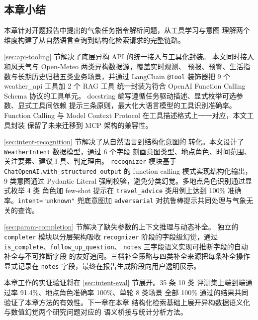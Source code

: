 
\subsection{本章小结}
\label{sec:retrieval-summary}

本章针对开题报告中提出的气象任务指令解析问题，从工具学习与意图
理解两个维度构建了从自然语言查询到结构化检索请求的完整链路。

\ref{sec:api-tooling} 节解决了底层异构 API 的统一接入与工具化封装。
本文同时接入和风天气与 Open-Meteo 两类异构数据源，覆盖实时观测、
预报、预警、生活指数与长期历史归档五类业务场景，并通过 LangChain
\texttt{@tool} 装饰器把 9 个 weather\_api 工具加 2 个 RAG 工具
统一封装为符合 OpenAI Function Calling Schema 协议的工具单元。
docstring 编写遵循任务驱动描述、显式枚举可选参数、显式工具间依赖
提示三条原则，最大化大语言模型的工具识别准确率。Function Calling
与 Model Context Protocol 在工具描述格式上一一对应，本文工具封装
保留了未来迁移到 MCP 架构的兼容性。

\ref{sec:intent-recognition} 节解决了从自然语言到结构化意图的
转化。本文设计了 \texttt{WeatherIntent} 数据模型，通过 6 个字段
刻画意图类型、地点角色、时间范围、关注要素、建议工具、判定理由。
\texttt{recognizer} 模块基于 \texttt{ChatOpenAI.\bk{}with\_\bk{}structured\_\bk{}output}
的 function calling 模式实现结构化输出，9 类意图通过 Pydantic
Literal 强制校验，避免分类幻觉。多地点角色识别通过显式枚举 4 类
角色加 few-shot 提示在 \texttt{travel\_\bk{}advice} 类用例上达到 100\%
准确率。\texttt{intent=\bk{}"unknown"} 兜底意图加 \texttt{adversarial}
对抗鲁棒提示共同处理与气象无关的查询。

\ref{sec:param-completion} 节解决了缺失参数的上下文推理与动态补全。
独立的 \texttt{completer} 模块以分层架构吸收 \texttt{recognizer}
阶段的字段级幻觉，通过 \texttt{is\_\bk{}complete}、\texttt{follow\_\bk{}up\_\bk{}question}、
\texttt{notes} 三字段语义实现可推断字段的自动补全与不可推断字段
的友好追问。三档补全策略与四类补全来源把每条补全操作显式记录在
\texttt{notes} 字段，最终在报告生成阶段向用户透明展示。

本章工作的实证验证将在 \ref{sec:intent-eval} 节展开。35 条 10 类
评测集上端到端通过率 91.4\%、地点角色准确率 100\%、单轮 8 类场景
全部 100\% 通过的结果共同验证了本章方法的有效性。下一章在本章
结构化检索基础上展开异构数据语义化与数值幻觉两个研究问题对应的
语义桥接与统计分析方法。


